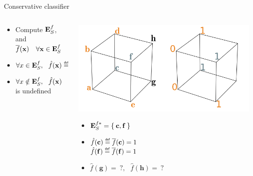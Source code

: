 \documentclass{beamer}
\begin{document}
\begin{frame}{Conservative classifier\cite{StrYvoREPORT05}}
  \begin{columns}
    \begin{column}{0.5\textwidth}
      \begin{itemize}
        \item Compute $\mathbf{E}_{S}^{f}$, and $\overline{f}(\mathbf{x}) ~~~ \forall \mathbf{x} \in \mathbf{E}_{S}^{f}$
        \item $\forall x \in\esf, ~~ \hat{f}(\mathbf{x}) \eqdef \albl{\mathbf{x}}$
        \item $\forall x \notin \mathbf{E}_{S}^{f}, ~~ \hat{f}(\mathbf{x})$ is undefined
      \end{itemize}
    \end{column}
    \begin{column}{0.5\textwidth}
      \begin{center}
        \includegraphics[width=.9\textwidth]{figures/ae_example_pres.png}
      \end{center}
      \begin{itemize}
      \item $\mathbf{E}_{S}^{f*} = \Set{\mathbf{c}, \mathbf{f}}$
      \item $\hat{f}(\mathbf{c}) \eqdef \albl{\mathbf{c}} = 1$\\
        $\hat{f}(\mathbf{f}) \eqdef \albl{\mathbf{f}} = 1$
      \item $\hat{f}(\mathbf{g}) =~?, ~~~ \hat{f}(\mathbf{h}) =~?$
      \end{itemize}
    \end{column}
  \end{columns}
\end{frame}
\end{document}
